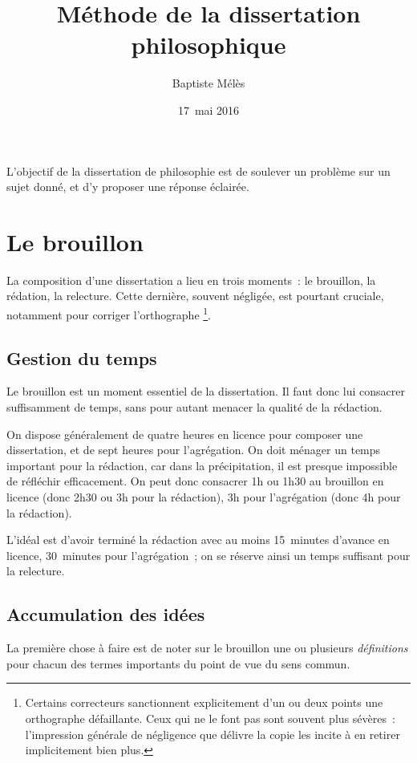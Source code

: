 \documentclass[a4paper]{article}
\title{Méthode de la dissertation philosophique}
\author{Baptiste Mélès}
\date{17 mai 2016}
\begin{document}
\maketitle

\setcounter{tocdepth}{3}
\tableofcontents
\vspace*{1cm}

L'objectif de la dissertation de philosophie est de soulever un problème
sur un sujet donné, et d'y proposer une réponse éclairée.


\section{Le brouillon}
\label{sec-1}


La composition d'une dissertation a lieu en trois moments : le
brouillon, la rédation, la relecture. Cette dernière, souvent négligée,
est pourtant cruciale, notamment pour corriger l'orthographe \footnote{Certains correcteurs sanctionnent explicitement d'un ou deux points
    une orthographe défaillante. Ceux qui ne le font pas sont souvent
    plus sévères : l'impression générale de négligence que délivre la
    copie les incite à en retirer implicitement bien plus.
 }.
\subsection{Gestion du temps}
\label{sec-1-1}


Le brouillon est un moment essentiel de la dissertation. Il faut donc
lui consacrer suffisamment de temps, sans pour autant menacer la qualité
de la rédaction.

On dispose généralement de quatre heures en licence pour composer une
dissertation, et de sept heures pour l'agrégation. On doit ménager un
temps important pour la rédaction, car dans la précipitation, il est
presque impossible de réfléchir efficacement. On peut donc consacrer 1h
ou 1h30 au brouillon en licence (donc 2h30 ou 3h pour la rédaction), 3h
pour l'agrégation (donc 4h pour la rédaction).

L'idéal est d'avoir terminé la rédaction avec au moins 15 minutes
d'avance en licence, 30 minutes pour l'agrégation ; on se réserve ainsi
un temps suffisant pour la relecture.
\subsection{Accumulation des idées}
\label{sec-1-2}


La première chose à faire est de noter sur le brouillon une ou plusieurs
\emph{définitions} pour chacun des termes importants du point de vue du sens
commun.
\end{document}
